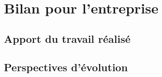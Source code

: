 \chapter{Bilan pour l'entreprise}
\lipsum
\section{Apport du travail réalisé}
\lipsum
\section{Perspectives d'évolution}
\lipsum
